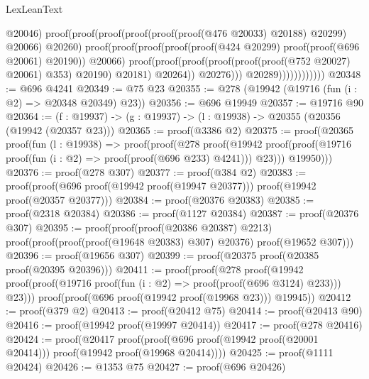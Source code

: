 \begin{lexlean}{LexLeanText}
\begin{coremodule}
                                          @20046)
                                        proof(proof(proof(proof(proof(proof(@476 @20033) @20188)
                                                  @20299)
                                                @20066)
                                              @20260)
                                            proof(proof(proof(proof(proof(@424 @20299)
                                                      proof(proof(@696 @20061) @20190))
                                                    @20066)
                                                  proof(proof(proof(proof(proof(proof(@752 @20027)
                                                              @20061)
                                                            @353)
                                                          @20190)
                                                        @20181)
                                                      @20264))
                                                @20276)))
                                      @20289))))))))))))
@20348 := @696 @4241
@20349 := @75 @23
@20355 := @278 (@19942 (@19716 (fun (i : @2) => @20348 @20349) @23))
@20356 := @696 @19949
@20357 := @19716 @90
@20364 := (f : @19937) -> (g : @19937) -> (l : @19938) -> @20355 (@20356 (@19942 (@20357 @23)))
@20365 := proof(@3386 @2)
@20375 := proof(@20365
      proof(fun (l : @19938) =>
        proof(proof(@278
              proof(@19942
                  proof(proof(@19716 proof(fun (i : @2) => proof(proof(@696 @233) @4241))) @23)))
            @19950)))
@20376 := proof(@278 @307)
@20377 := proof(@384 @2)
@20383 := proof(proof(@696 proof(@19942 proof(@19947 @20377))) proof(@19942 proof(@20357 @20377)))
@20384 := proof(@20376 @20383)
@20385 := proof(@2318 @20384)
@20386 := proof(@1127 @20384)
@20387 := proof(@20376 @307)
@20395 := proof(proof(proof(@20386 @20387) @2213)
      proof(proof(proof(proof(@19648 @20383) @307) @20376) proof(@19652 @307)))
@20396 := proof(@19656 @307)
@20399 := proof(@20375 proof(@20385 proof(@20395 @20396)))
@20411 := proof(proof(@278
        proof(@19942 proof(proof(@19716 proof(fun (i : @2) => proof(proof(@696 @3124) @233))) @23)))
      proof(proof(@696 proof(@19942 proof(@19968 @23))) @19945))
@20412 := proof(@379 @2)
@20413 := proof(@20412 @75)
@20414 := proof(@20413 @90)
@20416 := proof(@19942 proof(@19997 @20414))
@20417 := proof(@278 @20416)
@20424 := proof(@20417
      proof(proof(@696 proof(@19942 proof(@20001 @20414))) proof(@19942 proof(@19968 @20414))))
@20425 := proof(@1111 @20424)
@20426 := @1353 @75
@20427 := proof(@696 @20426)

\end{coremodule}
\end{lexlean}
